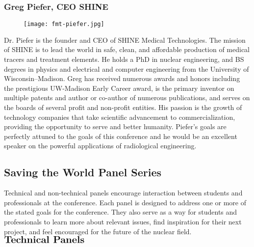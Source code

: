 \subsubsection{Greg Piefer, CEO SHINE}
\setlength\intextsep{0pt}
\begin{wrapfigure}{R}{0.25\textwidth}
	\begin{center}
		\texttt{[image: fmt-piefer.jpg]}
	\end{center}
\end{wrapfigure}
Dr. Piefer is the founder and CEO of SHINE Medical Technologies. The mission of SHINE is to lead the world in safe, clean, and affordable production of medical tracers and treatment elements. He holds a PhD in nuclear engineering, and BS degrees in physics and electrical and computer engineering from the University of Wisconsin–Madison. Greg has received numerous awards and honors including the prestigious UW-Madison Early Career award, is the primary inventor on multiple patents and author or co-author of numerous publications, and serves on the boards of several profit and non-profit entities. His passion is the growth of technology companies that take scientific advancement to commercialization, providing the opportunity to serve and better humanity. Piefer's goals are perfectly attuned to the goals of this conference and he would be an excellent speaker on the powerful applications of radiological engineering.\\

\subsection{Saving the World Panel Series}
Technical and non-technical panels encourage interaction between students and professionals at the conference. Each panel is designed to address one or more of the stated goals for the conference. They also serve as a way for students and professionals to learn more about relevant issues, find inspiration for their next project, and feel encouraged for the future of the nuclear field.\\
 
$\Large\textbf{Technical Panels}$

